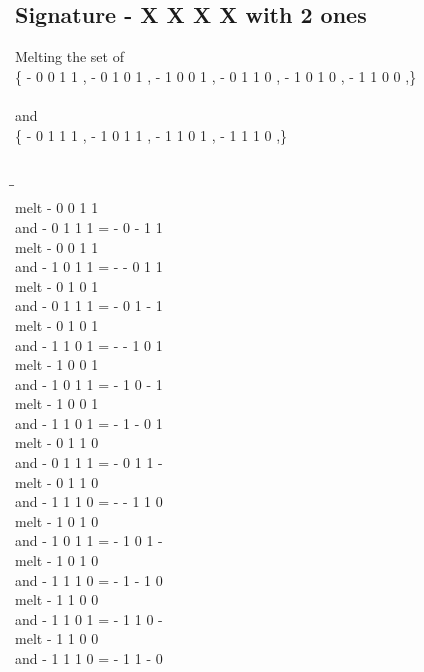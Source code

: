 \documentclass{article}
\begin{document}
\subsection{Signature - X X X X with 2 ones}
Melting the set of\\
\{ -  0  0  1  1 , -  0  1  0  1 , -  1  0  0  1 , -  0  1  1  0 , -  1  0  1  0 , -  1  1  0  0 ,\}\\\\
and\\
\{ -  0  1  1  1 , -  1  0  1  1 , -  1  1  0  1 , -  1  1  1  0 ,\}\\\\
\begin{tabbing}
\hspace{3cm}\=\hspace{3cm}\=\hspace{3cm}\\[1cm]
melt\> -  0  0  1  1 \\
and\> -  0  1  1  1 \>
 =  -  0  -  1  1 \\[1mm]
melt\> -  0  0  1  1 \\
and\> -  1  0  1  1 \>
 =  -  -  0  1  1 \\[1mm]
melt\> -  0  1  0  1 \\
and\> -  0  1  1  1 \>
 =  -  0  1  -  1 \\[1mm]
melt\> -  0  1  0  1 \\
and\> -  1  1  0  1 \>
 =  -  -  1  0  1 \\[1mm]
melt\> -  1  0  0  1 \\
and\> -  1  0  1  1 \>
 =  -  1  0  -  1 \\[1mm]
melt\> -  1  0  0  1 \\
and\> -  1  1  0  1 \>
 =  -  1  -  0  1 \\[1mm]
melt\> -  0  1  1  0 \\
and\> -  0  1  1  1 \>
 =  -  0  1  1  - \\[1mm]
melt\> -  0  1  1  0 \\
and\> -  1  1  1  0 \>
 =  -  -  1  1  0 \\[1mm]
melt\> -  1  0  1  0 \\
and\> -  1  0  1  1 \>
 =  -  1  0  1  - \\[1mm]
melt\> -  1  0  1  0 \\
and\> -  1  1  1  0 \>
 =  -  1  -  1  0 \\[1mm]
melt\> -  1  1  0  0 \\
and\> -  1  1  0  1 \>
 =  -  1  1  0  - \\[1mm]
melt\> -  1  1  0  0 \\
and\> -  1  1  1  0 \>
 =  -  1  1  -  0 \\[1mm]
\end{tabbing}
\newpage
\end{document}
